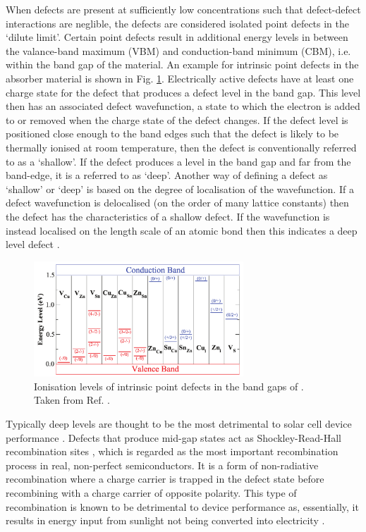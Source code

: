 \documentclass[11pt, twoside]{report}
\begin{document}
When defects are present at sufficiently low concentrations such that defect-defect interactions are neglible, the defects are considered isolated point defects in the `dilute limit'. Certain point defects result in additional energy levels in between the valance-band maximum (VBM) and conduction-band minimum (CBM), i.e. within the band gap of the material. An example for intrinsic point defects in the absorber material {\CZTS} is shown in Fig. \ref{defects_CZTS}. Electrically active defects have at least one charge state for the defect that produces a defect level in the band gap. This level then has an associated defect wavefunction, a state to which the electron is added to or removed when the charge state of the defect changes. If the defect level is positioned close enough to the band edges such that the defect is likely to be thermally ionised at room temperature, then the defect is conventionally referred to as a `shallow'. If the defect produces a level in the band gap and far from the band-edge, it is a referred to as `deep'.  Another way of defining a defect as `shallow' or `deep' is based on the degree of localisation of the wavefunction. If a defect wavefunction is delocalised (on the order of many lattice constants) then the defect has the characteristics of a shallow defect. If the wavefunction is instead localised on the length scale of an atomic bond then this indicates a deep level defect \cite{defects_tutorial}. 

\begin{figure}[h!]
  \centering
    \includegraphics[width=0.7\textwidth]{figures/Chen_CZTS_defects.png}
    \caption[Ionisation levels of intrinsic point defects in the band gaps of {\CZTS}]{Ionisation levels of intrinsic point defects in the band gaps of {\CZTS}. Taken from Ref. .}
  \label{defects_CZTS}
\end{figure}

Typically deep levels are thought to be the most detrimental to solar cell device performance \cite{Stoneham_killer_defects}. 
Defects that produce mid-gap states act as Shockley-Read-Hall recombination sites \cite{SRH}, which is regarded as the most important recombination process in real, non-perfect semiconductors. It is a form of non-radiative recombination where a charge carrier is trapped in the defect state before recombining with a charge carrier of opposite polarity. This type of recombination is known to be detrimental to device performance as, essentially, it results in energy input from sunlight not being converted into electricity \cite{Nelson4}.
\end{document}
